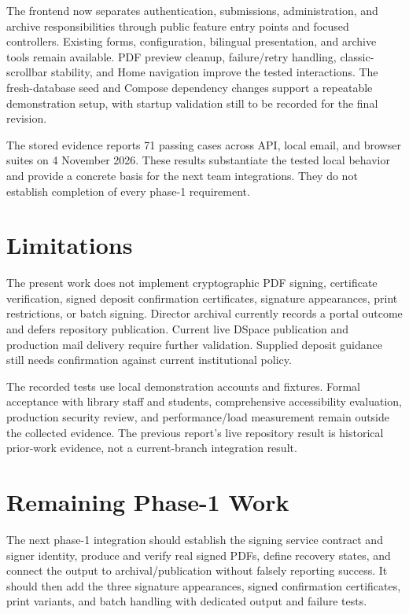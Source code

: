 \documentclass[11pt,a4paper]{report}
\begin{document}
The frontend now separates authentication, submissions, administration, and archive responsibilities through public feature entry points and focused controllers. Existing forms, configuration, bilingual presentation, and archive tools remain available. PDF preview cleanup, failure/retry handling, classic-scrollbar stability, and Home navigation improve the tested interactions. The fresh-database seed and Compose dependency changes support a repeatable demonstration setup, with startup validation still to be recorded for the final revision.

The stored evidence reports 71 passing cases across API, local email, and browser suites on 4 November 2026. These results substantiate the tested local behavior and provide a concrete basis for the next team integrations. They do not establish completion of every phase-1 requirement.

\section{Limitations}
The present work does not implement cryptographic PDF signing, certificate verification, signed deposit confirmation certificates, signature appearances, print restrictions, or batch signing. Director archival currently records a portal outcome and defers repository publication. Current live DSpace publication and production mail delivery require further validation. Supplied deposit guidance still needs confirmation against current institutional policy.

The recorded tests use local demonstration accounts and fixtures. Formal acceptance with library staff and students, comprehensive accessibility evaluation, production security review, and performance/load measurement remain outside the collected evidence. The previous report's live repository result is historical prior-work evidence, not a current-branch integration result.

\section{Remaining Phase-1 Work}
The next phase-1 integration should establish the signing service contract and signer identity, produce and verify real signed PDFs, define recovery states, and connect the output to archival/publication without falsely reporting success. It should then add the three signature appearances, signed confirmation certificates, print variants, and batch handling with dedicated output and failure tests.
\end{document}
